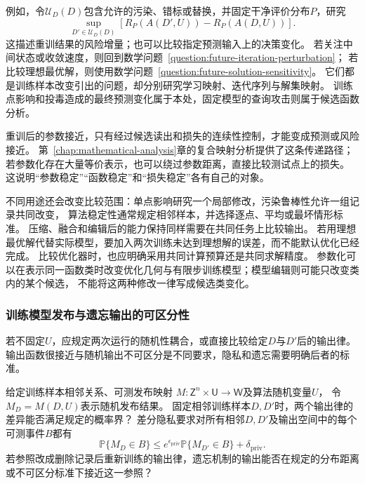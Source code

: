 例如，令$\mathcal U_D(D)$包含允许的污染、错标或替换，并固定干净评价分布$P$，研究
\begin{equation}
  \sup_{D'\in\mathcal U_D(D)}
  \left[R_P(A(D',U))-R_P(A(D,U))\right].
  \label{eq:future-training-robustness-question}
\end{equation}
这描述重训结果的风险增量；也可以比较指定预测输入上的决策变化。
若关注中间状态或收敛速度，则回到数学问题~\ref{question:future-iteration-perturbation}；
若比较理想最优解，则使用数学问题~\ref{question:future-solution-sensitivity}。
它们都是训练样本改变引出的问题，却分别研究学习映射、迭代序列与解集映射。
训练点影响和投毒造成的最终预测变化属于本处，固定模型的查询攻击则属于候选函数分析。

重训后的参数接近，只有经过候选读出和损失的连续性控制，才能变成预测或风险接近。
第~\ref{chap:mathematical-analysis}章的复合映射分析提供了这条传递路径；
若参数化存在大量等价表示，也可以绕过参数距离，直接比较测试点上的损失。
这说明“参数稳定”“函数稳定”和“损失稳定”各有自己的对象。

不同用途还会改变比较范围：单点影响研究一个局部修改，污染鲁棒性允许一组记录共同改变，
算法稳定性通常规定相邻样本，并选择逐点、平均或最坏情形标准。
压缩、融合和编辑后的能力保持同样需要在共同任务上比较输出。
若用理想最优解代替实际模型，要加入两次训练未达到理想解的误差，而不能默认优化已经完成。
比较优化器时，也应明确采用共同计算预算还是共同求解精度。
参数化可以在表示同一函数类时改变优化几何与有限步训练模型；模型编辑则可能只改变类内的某个候选，
不能将这两种修改一律写成候选类变化。

\subsubsection{训练模型发布与遗忘输出的可区分性}
\label{sec:future-analysis-output-law}

若不固定$U$，应规定两次运行的随机性耦合，或直接比较给定$D$与$D'$后的输出律。
输出函数很接近与随机输出不可区分是不同要求，隐私和遗忘需要明确后者的标准。

\begin{mathproblem}[随机输出律的可区分程度]
  \label{question:future-output-law}
  给定训练样本相邻关系、可测发布映射
  $M:\mathsf Z^n\times\mathsf U\to\mathsf W$及算法随机变量$U$，
  令$M_D=M(D,U)$表示随机发布结果。
  固定相邻训练样本$D,D'$时，两个输出律的差异能否满足规定的概率界？
  差分隐私要求对所有相邻$D,D'$及输出空间中的每个可测事件$B$都有
  \[
    \mathbb P\{M_D\in B\}
    \leq e^{\epsilon_{\mathrm{priv}}}
       \mathbb P\{M_{D'}\in B\}+\delta_{\mathrm{priv}}.
  \]
  若参照改成删除记录后重新训练的输出律，遗忘机制的输出能否在规定的分布距离
  或不可区分标准下接近这一参照？
\end{mathproblem}

